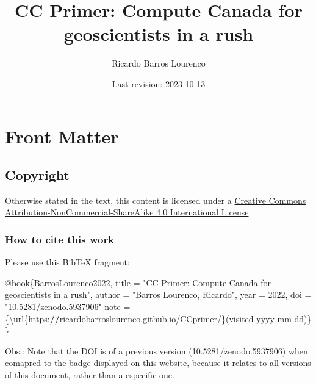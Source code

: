 \documentclass[
]{book}
\title{CC Primer: Compute Canada for geoscientists in a rush}
\author{Ricardo Barros Lourenco}
\date{Last revision: 2023-10-13}
\newenvironment{Shaded}{\begin{snugshade}}{\end{snugshade}}
\newcommand{\DecValTok}[1]{\textcolor[rgb]{0.00,0.00,0.81}{#1}}
\newcommand{\ErrorTok}[1]{\textcolor[rgb]{0.64,0.00,0.00}{\textbf{#1}}}
\newcommand{\NormalTok}[1]{#1}
\newcommand{\OtherTok}[1]{\textcolor[rgb]{0.56,0.35,0.01}{#1}}
\newcommand{\SpecialCharTok}[1]{\textcolor[rgb]{0.00,0.00,0.00}{#1}}
\newcommand{\StringTok}[1]{\textcolor[rgb]{0.31,0.60,0.02}{#1}}
\begin{document}
\maketitle

{
\setcounter{tocdepth}{1}
\tableofcontents
}
\hypertarget{front-matter}{%
\chapter{Front Matter}\label{front-matter}}

\hypertarget{copyright}{%
\section{Copyright}\label{copyright}}

Otherwise stated in the text, this content is licensed under a \href{http://creativecommons.org/licenses/by-nc-sa/4.0/}{Creative Commons Attribution-NonCommercial-ShareAlike 4.0 International License}.

\hypertarget{how-to-cite-this-work}{%
\subsection{How to cite this work}\label{how-to-cite-this-work}}

Please use this BibTeX fragment:

\begin{Shaded}
\begin{Highlighting}[]
\SpecialCharTok{@}\NormalTok{book\{BarrosLourenco2022,}
\NormalTok{  title     }\OtherTok{=} \StringTok{"CC Primer: Compute Canada for geoscientists in a rush"}\NormalTok{,}
\NormalTok{  author    }\OtherTok{=} \StringTok{"Barros Lourenco, Ricardo"}\NormalTok{,}
\NormalTok{  year      }\OtherTok{=} \DecValTok{2022}\NormalTok{,}
\NormalTok{  doi       }\OtherTok{=} \StringTok{"10.5281/zenodo.5937906"}
\NormalTok{  note      }\OtherTok{=}\NormalTok{ \{\textbackslash{}url\{https}\SpecialCharTok{:}\ErrorTok{//}\NormalTok{ricardobarroslourenco.github.io}\SpecialCharTok{/}\NormalTok{CCprimer}\SpecialCharTok{/}\NormalTok{\}(visited yyyy}\SpecialCharTok{{-}}\NormalTok{mm}\SpecialCharTok{{-}}\NormalTok{dd)\}}
\NormalTok{\}}
\end{Highlighting}
\end{Shaded}

Obs.: Note that the DOI is of a previous version (10.5281/zenodo.5937906) when
comapred to the badge displayed on this website, because it relates to all versions
of this document, rather than a especific one.
\end{document}
